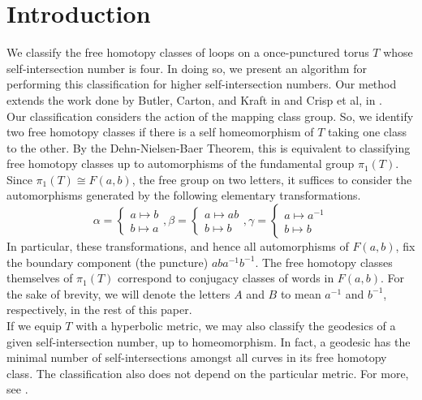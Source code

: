\documentclass[11pt]{article}
\begin{document}
\section{Introduction}

We classify the free homotopy classes of loops on a once-punctured torus $T$ whose self-intersection number is four. In doing so, we present an algorithm for performing this classification for higher self-intersection numbers. Our method extends the work done by Butler, Carton, and Kraft in \cite{geo3} and Crisp et al, in \cite{geo2}.\\

Our classification considers the action of the mapping class group. So, we identify two free homotopy classes if there is a self homeomorphism of $T$ taking one class to the other. By the Dehn-Nielsen-Baer Theorem, this is equivalent to classifying free homotopy classes up to automorphisms of the fundamental group $\pi_1(T)$. Since $\pi_1(T)\cong F(a,b)$, the free group on two letters, it suffices to consider the automorphisms generated by the following elementary transformations.
\begin{equation*}
\alpha=\begin{cases} a\mapsto b\\ b\mapsto a\end{cases},
\beta=\begin{cases} a\mapsto ab\\ b\mapsto b\end{cases},
\gamma=\begin{cases} a\mapsto a^{-1}\\ b\mapsto b\end{cases}
\end{equation*}
In particular, these transformations, and hence all automorphisms of $F(a,b)$, fix the boundary component (the puncture) $aba^{-1}b^{-1}$. The free homotopy classes themselves of $\pi_1(T)$ correspond to conjugacy classes of words in $F(a,b)$. For the sake of brevity, we will denote the letters $A$ and $B$ to mean $a^{-1}$ and $b^{-1}$, respectively, in the rest of this paper.\\

If we equip $T$ with a hyperbolic metric, we may also classify the geodesics of a given self-intersection number, up to homeomorphism. In fact, a geodesic has the minimal number of self-intersections amongst all curves in its free homotopy class. The classification also does not depend on the particular metric. For more, see \cite{geo2}.
\end{document}
